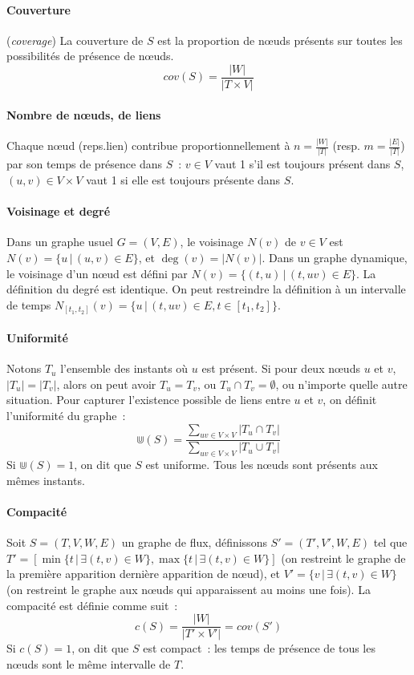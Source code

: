 \documentclass[12pt,a4paper]{article}
\begin{document}
\paragraph{Couverture} (\textit{coverage}) La couverture de \(S\) est
la proportion de nœuds présents sur toutes les possibilités de
présence de nœuds.
\[cov(S) = \frac{|W|}{|T \times V|}\]

\paragraph{Nombre de nœuds, de liens} Chaque nœud (reps.\@ lien)
contribue proportionnellement à \(n = \frac{|W|}{|T|}\) (resp.\@
\(m = \frac{|E|}{|T|}\)) par son temps de présence dans \(S\)~:
\(v \in V\) vaut 1 s'il est toujours présent dans \(S\),
\((u, v) \in V \times V\) vaut 1 si elle est toujours présente dans
\(S\).

\paragraph{Voisinage et degré} Dans un graphe usuel \(G = (V, E)\), le
voisinage \(N(v)\) de \(v \in V\) est
\(N(v) = \{u \,|\, (u, v) \in E\}\), et \(\deg(v) = |N(v)|\). Dans un
graphe dynamique, le voisinage d'un nœud est défini par
\(N(v) = \{(t, u) \,|\, (t, uv) \in E\}\). La définition du degré est
identique. On peut restreindre la définition à un intervalle de temps
\(N_{[t_1, t_2]}(v) = \{u \,|\, (t, uv) \in E, t \in [t_1, t_2]\}\).\\

\paragraph{Uniformité} Notons \(T_u\) l'ensemble des instants où \(u\)
est présent. Si pour deux nœuds \(u\) et \(v\), \(|T_u| = |T_v|\),
alors on peut avoir \(T_u = T_v\), ou \(T_u \cap T_v = \emptyset\), ou
n'importe quelle autre situation. Pour capturer l'existence possible
de liens entre \(u\) et \(v\), on définit l'uniformité du graphe~:
\[\Cup(S) = \frac{\sum_{uv \in V \times V}|T_u \cap T_v|}{\sum_{uv \in
      V \times V}|T_u \cup T_v|}\]
Si \(\Cup(S) = 1\), on dit que \(S\) est uniforme. Tous les nœuds sont
présents aux mêmes instants.

\paragraph{Compacité} Soit \(S = (T, V, W, E)\) un graphe de flux,
définissons \(S' = (T', V', W, E)\) tel que
\(T' = [\min\{t \,|\, \exists (t, v) \in W\}, \max\{t \,|\, \exists
(t, v) \in W\}]\) (on restreint le graphe de la première apparition
dernière apparition de nœud), et
\(V' = \{v \,|\, \exists (t, v) \in W\}\) (on restreint le graphe aux
nœuds qui apparaissent au moins une fois). La compacité est définie
comme suit~:
\[c(S) = \frac{|W|}{|T' \times V'|} = cov(S')\]
Si \(c(S) = 1\), on dit que \(S\) est compact~: les temps de présence
de tous les nœuds sont le même intervalle de \(T\).\\
\end{document}
